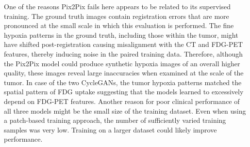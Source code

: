 One of the reasons Pix2Pix fails here appears to be related to its supervised training. The ground truth images contain registration errors that are more pronounced at the small scale in which this evaluation is performed. The fine hypoxia patterns in the ground truth, including those within the tumor, might have shifted post-registration causing misalignment with the CT and FDG-PET features, thereby inducing noise in the paired training data. Therefore, although the Pix2Pix model could produce synthetic hypoxia images of an overall higher quality, these images reveal large inaccuracies when examined at the scale of the tumor.
In case of the two CycleGANs, the tumor hypoxia patterns matched the spatial pattern of FDG uptake suggesting that the models learned to excessively depend on FDG-PET features. Another reason for poor clinical performance of all three models might be the small size of the training dataset. Even when using a patch-based training approach, the number of sufficiently varied training samples was very low. Training on a larger dataset could likely improve performance.
